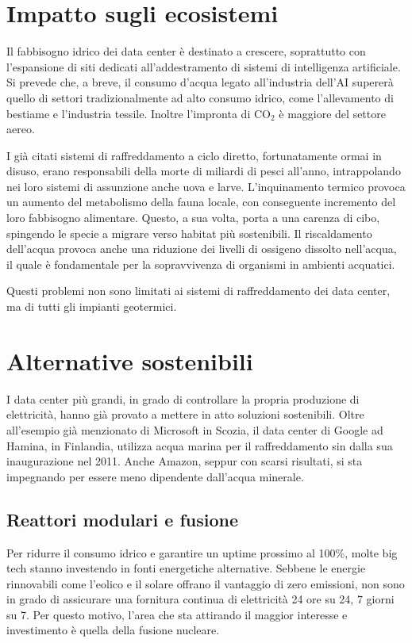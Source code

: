 \documentclass[12pt,a4paper,oneside]{book}
\begin{document}
\section{Impatto sugli ecosistemi}
Il fabbisogno idrico dei data center è destinato a crescere, soprattutto con l'espansione di siti dedicati all'addestramento di sistemi di intelligenza artificiale. Si prevede che, a breve, il consumo d'acqua legato all'industria dell'AI supererà quello di settori tradizionalmente ad alto consumo idrico, come l'allevamento di bestiame e l'industria tessile. Inoltre l'impronta di CO$_2$ è maggiore del settore aereo.

I già citati sistemi di raffreddamento a ciclo diretto, fortunatamente ormai in disuso, erano responsabili della morte di miliardi di pesci all'anno, intrappolando nei loro sistemi di assunzione anche uova e larve. L'inquinamento termico provoca un aumento del metabolismo della fauna locale, con conseguente incremento del loro fabbisogno alimentare. Questo, a sua volta, porta a una carenza di cibo, spingendo le specie a migrare verso habitat più sostenibili. Il riscaldamento dell'acqua provoca anche una riduzione dei livelli di ossigeno dissolto nell'acqua, il quale è fondamentale per la sopravvivenza di organismi in ambienti acquatici.

Questi problemi non sono limitati ai sistemi di raffreddamento dei data center, ma di tutti gli impianti geotermici.

\section{Alternative sostenibili}

I data center più grandi, in grado di controllare la propria produzione di elettricità, hanno già provato a mettere in atto soluzioni sostenibili. Oltre all'esempio già menzionato di Microsoft in Scozia, il data center di Google ad Hamina, in Finlandia, utilizza acqua marina per il raffreddamento sin dalla sua inaugurazione nel 2011. Anche Amazon, seppur con scarsi risultati, si sta impegnando per essere meno dipendente dall'acqua minerale.

\subsection{Reattori modulari e fusione}
Per ridurre il consumo idrico e garantire un uptime prossimo al 100\%, molte big tech stanno investendo in fonti energetiche alternative. Sebbene le energie rinnovabili come l'eolico e il solare offrano il vantaggio di zero emissioni, non sono in grado di assicurare una fornitura continua di elettricità 24 ore su 24, 7 giorni su 7. Per questo motivo, l'area che sta attirando il maggior interesse e investimento è quella della fusione nucleare.
\end{document}
